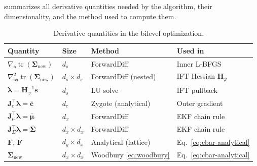 \documentclass[11pt]{article}
\newcommand{\tr}{\operatorname{tr}}
\newcommand{\bs}{\bm{s}}
\newcommand{\bc}{\bm{c}}
\newcommand{\bmu}{\bm{\mu}}
\newcommand{\bla}{\bm{\lambda}}
\newcommand{\Snew}{\bm{\Sigma}_{\mathrm{new}}}
\theoremstyle{definition}
\begin{document}
 summarizes all derivative quantities needed by the
algorithm, their dimensionality, and the method used to compute them.

\begin{table}[h]
\centering
\caption{Derivative quantities in the bilevel optimization.}
\label{tab:derivatives}
\begin{tabular}{@{}llll@{}}
\toprule
\textbf{Quantity} & \textbf{Size} & \textbf{Method} & \textbf{Used in} \\
\midrule
$\nabla_{\bs}\tr(\Snew)$ & $d_s$ & ForwardDiff & Inner L-BFGS \\
$\nabla^2_{\bs\bs}\tr(\Snew)$ & $d_s \times d_s$ & ForwardDiff (nested) & IFT Hessian $\bm{H}_\varphi$ \\
$\bla = \bm{H}_\varphi^{-1}\bar{\bs}$ & $d_s$ & LU solve & IFT pullback \\
$\bm{J}_c^\top\bla = \bar{\bc}$ & $d_c$ & Zygote (analytical) & Outer gradient \\
$\bm{J}_\mu^\top\bla = \bar{\bmu}$ & $d_x$ & ForwardDiff & EKF chain rule \\
$\bm{J}_\Sigma^\top\bla = \bar{\bm{\Sigma}}$ & $d_x \times d_x$ & ForwardDiff & EKF chain rule \\
$\bm{F}$, $\dot{\bm{F}}$ & $d_y \times d_x$ & Analytical (lattice) & Eq.~\eqref{eq:cbar-analytical} \\
$\Snew$ & $d_x \times d_x$ & Woodbury \eqref{eq:woodbury} & Eq.~\eqref{eq:cbar-analytical} \\
\bottomrule
\end{tabular}
\end{table}
\end{document}
